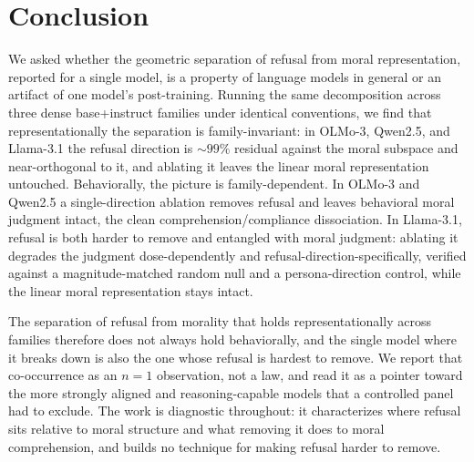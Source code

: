 \section{Conclusion}\label{conclusion}

We asked whether the geometric separation of refusal from moral representation,
reported for a single model, is a property of language models in general or an
artifact of one model's post-training. Running the same decomposition across three
dense base+instruct families under identical conventions, we find that
representationally the separation is family-invariant: in OLMo-3, Qwen2.5, and
Llama-3.1 the refusal direction is \({\sim}99\%\) residual against the moral
subspace and near-orthogonal to it, and ablating it leaves the linear moral
representation untouched. Behaviorally, the picture is family-dependent. In OLMo-3
and Qwen2.5 a single-direction ablation removes refusal and leaves behavioral
moral judgment intact, the clean comprehension/compliance dissociation. In
Llama-3.1, refusal is both harder to remove and entangled with moral judgment:
ablating it degrades the judgment dose-dependently and refusal-direction-specifically,
verified against a magnitude-matched random null and a persona-direction control,
while the linear moral representation stays intact.

The separation of refusal from morality that holds representationally across
families therefore does not always hold behaviorally, and the single model where
it breaks down is also the one whose refusal is hardest to remove. We report that
co-occurrence as an \(n=1\) observation, not a law, and read it as a pointer toward
the more strongly aligned and reasoning-capable models that a controlled panel had
to exclude. The work is diagnostic throughout: it characterizes where refusal sits
relative to moral structure and what removing it does to moral comprehension, and
builds no technique for making refusal harder to remove.
